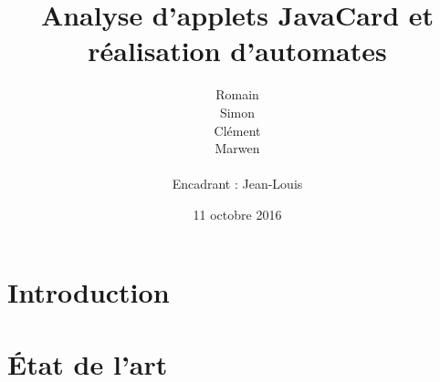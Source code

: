\documentclass[a4paper, 11pt]{article}
\title{Analyse d'applets JavaCard et réalisation d'automates}
\author{Romain \bsc{Barrat} \\
  Simon \bsc{Garrelou} \\
  Clément \bsc{Jarrige} \\
  Marwen \bsc{Sami} \\
  ~\\
  Encadrant : Jean-Louis \bsc{Lanet}}
\date{11 octobre 2016}
\begin{document}
\maketitle

\section*{Introduction}


\section{État de l'art}

\end{document}
